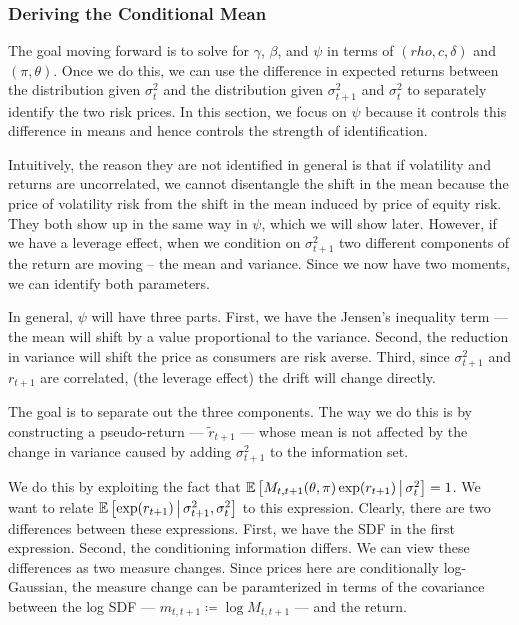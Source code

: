 \documentclass[11pt, letterpaper, twoside, final]{article}
\begin{document}
\subsubsection{Deriving the Conditional Mean}

The goal moving forward is to solve for $\gamma$, $\beta$, and $\psi$ in terms of $(rho, c, \delta)$ and $(\pi,
\theta)$.
Once we do this, we can use the difference in expected returns between the distribution given $\sigma^2_t$ and the
distribution given $\sigma^2_{t+1}$ and $\sigma^2_t$ to separately identify the two risk prices.
In this section, we focus on $\psi$ because it controls this difference in means and hence controls the strength
of identification.

Intuitively, the reason they are not identified in general is that if volatility and returns are uncorrelated, we
cannot disentangle the shift in the mean because the price of volatility risk from the shift in the mean induced
by price of equity risk.
They both show up in the same way in $\psi$, which we will show later.
However, if we have a leverage effect, when we condition on $\sigma^2_{t+1}$ two different components of the
return are moving -- the mean and variance.
Since we now have two moments, we can identify both parameters.

In general, $\psi$ will have three parts.
First, we have the Jensen's inequality term --- the mean will shift by a value proportional to the variance.
Second, the reduction in variance will shift the price as consumers are risk averse.
Third, since $\sigma^2_{t+1}$ and $r_{t+1}$ are correlated, (the leverage effect) the drift will change directly. 

The goal is to separate out the three components.
The way we do this is by constructing a pseudo-return --- $\widetilde{r}_{t+1}$ --- whose mean is not affected by
the change in variance caused by adding $\sigma^2_{t+1}$ to the information set.

We do this by exploiting the fact that $\operatorname{\mathbb{E}}\left[M_{t,t+1}(\theta, \pi) \exp(r_{t+1}) \,\middle\vert\, \sigma^2_t \right] =
1$.
We want to relate $\operatorname{\mathbb{E}}\left[\exp(r_{t+1}) \,\middle\vert\, \sigma^2_{t+1}, \sigma^2_t \right]$  to this expression.
Clearly, there are two differences between these expressions.
First, we have the SDF in the first expression.
Second, the conditioning information differs.
We can view these differences as two measure changes.
Since prices here are conditionally log-Gaussian, the measure change  can be paramterized in terms of the
covariance between the log SDF --- $m_{t,t+1} \coloneqq \log M_{t,t+1}$ --- and the return.
\end{document}
